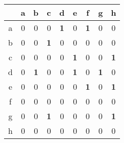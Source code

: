 \documentclass[a4paper]{article}
\begin{document}
\begin{tabular}{ c|c|c|c|c|c|c|c|c}
     & a & b & c & d & e & f & g & h \\
     \hline
    a & 0 & 0 & 0 & \textbf{1} & 0 & \textbf{1} & 0 & 0 \\
    \hline
    b & 0 & 0 & \textbf{1} & 0 & 0 & 0 & 0 & 0 \\
    \hline
    c & 0 & 0 & 0 & 0 & \textbf{1} & 0 & 0 & \textbf{1} \\
    \hline
    d & 0 & \textbf{1} & 0 & 0 & \textbf{1} & 0 & \textbf{1} & 0 \\
    \hline
    e & 0 & 0 & 0 & 0 & 0 & \textbf{1} & 0 & \textbf{1} \\
    \hline
    f & 0 & 0 & 0 & 0 & 0 & 0 & 0 & 0 \\
    \hline
    g & 0 & 0 & \textbf{1} & 0 & 0 & 0 & 0 & \textbf{1} \\
    \hline
    h & 0 & 0 & 0 & 0 & 0 & 0 & 0 & 0 \\
\end{tabular}\\
\end{document}
